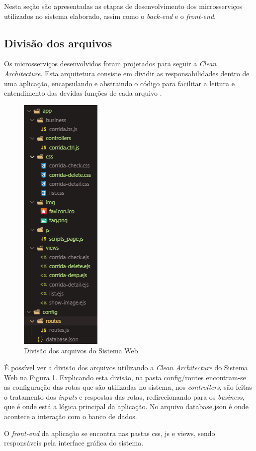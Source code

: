 Nesta seção são apresentadas as etapas de desenvolvimento dos microsserviços utilizados no sistema elaborado, assim como o \textit{back-end} e o \textit{front-end}. 

\subsection*{Divisão dos arquivos}

Os microsserviços desenvolvidos foram projetados para seguir a \textit{Clean Architecture}. Esta arquitetura consiste em dividir as responsabilidades dentro de uma aplicação, encapsulando e abstraindo o código para facilitar a leitura e entendimento das devidas funções de cada arquivo \cite{martin2000clean}.

\begin{figure}[htbp]
	\centering
	\includegraphics[width=0.22\linewidth]{figuras/WebService/cleanArchtecture.png}
	\caption{Divisão dos arquivos do Sistema Web}
	\label{fig:cleanArchtecture}
\end{figure}

É possível ver a divisão dos arquivos utilizando a \textit{Clean Architecture} do Sistema Web na Figura \ref{fig:cleanArchtecture}. Explicando esta divisão, na pasta config/routes encontram-se as configuração das rotas que são utilizadas no sistema, nos \textit{controllers}, são feitas o tratamento dos \textit{inputs} e respostas das rotas, redirecionando para os \textit{business}, que é onde está a lógica principal da aplicação. No arquivo database.json é onde acontece a interação com o banco de dados. 

O \textit{front-end} da aplicação se encontra nas pastas css, js e views, sendo responsáveis pela interface gráfica do sistema.

